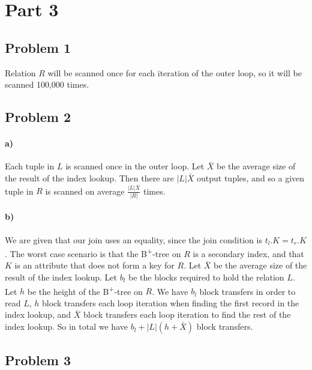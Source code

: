 \documentclass[12pt]{article}
\begin{document}
\section*{Part 3}

\subsection*{Problem 1}

Relation \(R\) will be scanned once for each iteration of the outer loop, so it will be scanned 100,000 times.

\subsection*{Problem 2}

\paragraph{a)}

Each tuple in \(L\) is scanned once in the outer loop. Let \(\bar{X}\) be the average size of the result of the index lookup. Then there are \(|L|\bar{X}\)
output tuples, and so a given tuple in \(R\) is scanned on average \(\frac{|L|\bar{X}}{|R|}\) times.

\paragraph{b)}

We are given that our join uses an equality, since the join condition is \(t_l.K=t_r.K\). The worst case scenario is that the B\textsuperscript{+}-tree on
\(R\) is a secondary index, and that \(K\) is an attribute that does not form a key for \(R\). Let \(\bar{X}\) be the average size of the result of the index lookup.
Let \(b_l\) be the blocks required to hold the relation \(L\). Let \(h\) be the height of the B\textsuperscript{+}-tree on \(R\). We have \(b_l\) block
transfers in order to read \(L\), \(h\) block transfers each loop iteration when finding the first record in the index lookup, and \(\bar{X}\) block transfers
each loop iteration to find the rest of the index lookup. So in total we have \(b_l+|L|(h+\bar{X})\) block transfers.

\subsection*{Problem 3}
\end{document}
